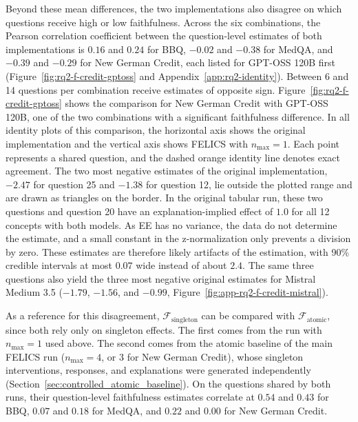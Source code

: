 Beyond these mean differences, the two implementations also disagree on which questions receive high or low faithfulness. Across the six combinations, the Pearson correlation coefficient between the question-level estimates of both implementations is $0.16$ and $0.24$ for BBQ, $-0.02$ and $-0.38$ for MedQA, and $-0.39$ and $-0.29$ for New German Credit, each listed for GPT-OSS 120B first (Figure~\ref{fig:rq2-f-credit-gptoss} and Appendix~\ref{app:rq2-identity}). Between 6 and 14 questions per combination receive estimates of opposite sign. Figure~\ref{fig:rq2-f-credit-gptoss} shows the comparison for New German Credit with GPT-OSS 120B, one of the two combinations with a significant faithfulness difference. In all identity plots of this comparison, the horizontal axis shows the original implementation and the vertical axis shows FELICS with $n_{\max}=1$. Each point represents a shared question, and the dashed orange identity line denotes exact agreement. The two most negative estimates of the original implementation, $-2.47$ for question 25 and $-1.38$ for question 12, lie outside the plotted range and are drawn as triangles on the border. In the original tabular run, these two questions and question 20 have an explanation-implied effect of $1.0$ for all 12 concepts with both models. As EE has no variance, the data do not determine the estimate, and a small constant in the z-normalization only prevents a division by zero. These estimates are therefore likely artifacts of the estimation, with 90\% credible intervals at most $0.07$ wide instead of about $2.4$. The same three questions also yield the three most negative original estimates for Mistral Medium 3.5 ($-1.79$, $-1.56$, and $-0.99$, Figure~\ref{fig:app-rq2-f-credit-mistral}).

As a reference for this disagreement, $\mathcal{F}_{\mathrm{singleton}}$ can be compared with $\mathcal{F}_{\mathrm{atomic}}$, since both rely only on singleton effects. The first comes from the run with $n_{\max}=1$ used above. The second comes from the atomic baseline of the main FELICS run ($n_{\max}=4$, or $3$ for New German Credit), whose singleton interventions, responses, and explanations were generated independently (Section~\ref{sec:controlled_atomic_baseline}). On the questions shared by both runs, their question-level faithfulness estimates correlate at $0.54$ and $0.43$ for BBQ, $0.07$ and $0.18$ for MedQA, and $0.22$ and $0.00$ for New German Credit.

